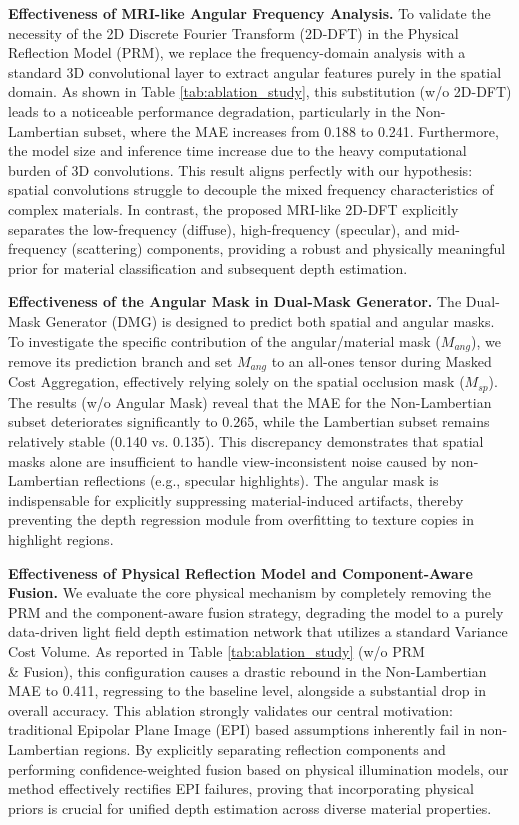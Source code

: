 \textbf{Effectiveness of MRI-like Angular Frequency Analysis.} 
To validate the necessity of the 2D Discrete Fourier Transform (2D-DFT) in the Physical Reflection Model (PRM), we replace the frequency-domain analysis with a standard 3D convolutional layer to extract angular features purely in the spatial domain. As shown in Table \ref{tab:ablation_study}, this substitution (w/o 2D-DFT) leads to a noticeable performance degradation, particularly in the Non-Lambertian subset, where the MAE increases from 0.188 to 0.241. Furthermore, the model size and inference time increase due to the heavy computational burden of 3D convolutions. This result aligns perfectly with our hypothesis: spatial convolutions struggle to decouple the mixed frequency characteristics of complex materials. In contrast, the proposed MRI-like 2D-DFT explicitly separates the low-frequency (diffuse), high-frequency (specular), and mid-frequency (scattering) components, providing a robust and physically meaningful prior for material classification and subsequent depth estimation.

\textbf{Effectiveness of the Angular Mask in Dual-Mask Generator.} 
The Dual-Mask Generator (DMG) is designed to predict both spatial and angular masks. To investigate the specific contribution of the angular/material mask ($M_{ang}$), we remove its prediction branch and set $M_{ang}$ to an all-ones tensor during Masked Cost Aggregation, effectively relying solely on the spatial occlusion mask ($M_{sp}$). The results (w/o Angular Mask) reveal that the MAE for the Non-Lambertian subset deteriorates significantly to 0.265, while the Lambertian subset remains relatively stable (0.140 vs. 0.135). This discrepancy demonstrates that spatial masks alone are insufficient to handle view-inconsistent noise caused by non-Lambertian reflections (e.g., specular highlights). The angular mask is indispensable for explicitly suppressing material-induced artifacts, thereby preventing the depth regression module from overfitting to texture copies in highlight regions.

\textbf{Effectiveness of Physical Reflection Model and Component-Aware Fusion.} 
We evaluate the core physical mechanism by completely removing the PRM and the component-aware fusion strategy, degrading the model to a purely data-driven light field depth estimation network that utilizes a standard Variance Cost Volume. As reported in Table \ref{tab:ablation_study} (w/o PRM \\& Fusion), this configuration causes a drastic rebound in the Non-Lambertian MAE to 0.411, regressing to the baseline level, alongside a substantial drop in overall accuracy. This ablation strongly validates our central motivation: traditional Epipolar Plane Image (EPI) based assumptions inherently fail in non-Lambertian regions. By explicitly separating reflection components and performing confidence-weighted fusion based on physical illumination models, our method effectively rectifies EPI failures, proving that incorporating physical priors is crucial for unified depth estimation across diverse material properties.

